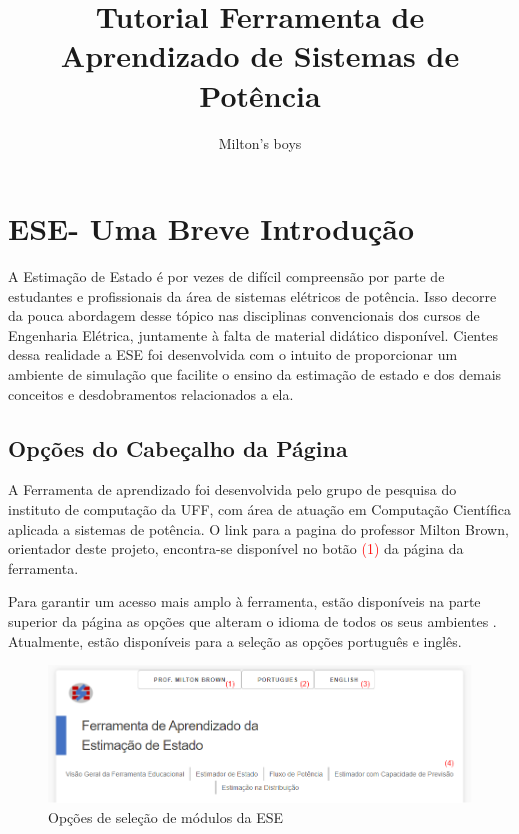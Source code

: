\documentclass{article}
\title{\textbf{Tutorial Ferramenta de Aprendizado de Sistemas de Potência}}
\author{Milton's boys}
\begin{document}
\maketitle

\section{ESE- Uma Breve Introdução}

A Estimação de Estado é por vezes de difícil compreensão  por parte de estudantes e profissionais da área de sistemas elétricos de potência. Isso decorre da pouca abordagem desse tópico nas disciplinas convencionais dos cursos de Engenharia Elétrica, juntamente à falta de material didático disponível. Cientes dessa realidade a ESE foi desenvolvida com o intuito de proporcionar um ambiente de simulação que facilite o ensino da estimação de estado e dos demais conceitos e desdobramentos relacionados a ela. 

\subsection{Opções do Cabeçalho da Página}
A Ferramenta de aprendizado foi desenvolvida pelo grupo de pesquisa do instituto de computação da UFF, com área de atuação em Computação Científica aplicada a sistemas de potência.
O link para a pagina do professor Milton Brown, orientador deste projeto,  encontra-se disponível no botão \textcolor{red}{(1)} da página da ferramenta.

Para garantir um acesso mais amplo à ferramenta, estão disponíveis na parte superior da página as opções que alteram o idioma de todos os seus ambientes . Atualmente, estão disponíveis para a seleção as opções português e inglês.

\begin{figure}[H]
\centering
\includegraphics[scale=.4]{Imagens/Topo_pagina.png}
\caption{Opções de seleção de módulos da ESE}
\label{fig:opções_cabeçalio}
\end{figure}
\end{document}
